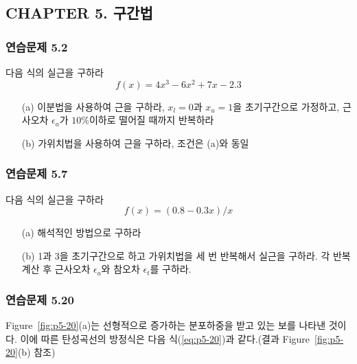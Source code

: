 \subsection{CHAPTER 5. 구간법}
\subsubsection{연습문제 5.2}
다음 식의 실근을 구하라
\begin{displaymath}
f(x)=4x^3-6x^2+7x-2.3
\end{displaymath}
\begin{itemize}
\item[(a)] 이분법을 사용하여 근을 구하라, $x_l =0$과 $x_{u}=1$을 초기구간으로 가정하고, 근사오차 $\epsilon_{a}$가 $10\%$이하로 떨어질 때까지 반복하라
\item[(b)] 가위치법을 사용하여 근을 구하라, 조건은 (a)와 동일
\end{itemize}

\subsubsection{연습문제 5.7}
다음 식의 실근을 구하라
\begin{displaymath}
f(x)=(0.8-0.3x)/x
\end{displaymath}
\begin{itemize}
\item[(a)] 해석적인 방법으로 구하라
\item[(b)] 1과 3을 초기구간으로 하고 가위치법을 세 번 반복해서 실근을 구하라. 각 반복계산 후 근사오차 $\epsilon_{a}$와 참오차 $\epsilon_{t}$를 구하라.
\end{itemize}

\subsubsection{연습문제 5.20}
Figure~\ref{fig:p5-20}(a)는 선형적으로 증가하는 분포하중을 받고 있는 보를 나타낸 것이다. 이에 따른 탄성곡선의 방정식은 다음 식(\ref{eq:p5-20})과 같다.(결과 Figure~\ref{fig:p5-20}(b) 참조)

